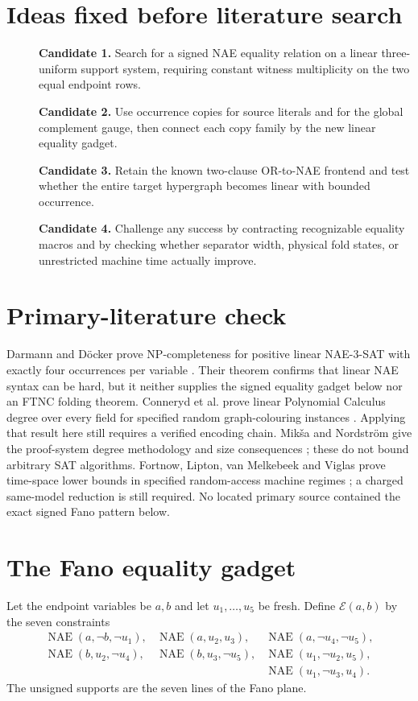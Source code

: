 \documentclass[11pt]{article}
\begin{document}
\section{Ideas fixed before literature search}
\begin{description}
\item[] \textbf{Candidate 1.} Search for a signed NAE equality relation on a
linear three-uniform support system, requiring constant witness multiplicity
on the two equal endpoint rows.
\item[] \textbf{Candidate 2.} Use occurrence copies for source literals and
for the global complement gauge, then connect each copy family by the new
linear equality gadget.
\item[] \textbf{Candidate 3.} Retain the known two-clause OR-to-NAE frontend
and test whether the entire target hypergraph becomes linear with bounded
occurrence.
\item[] \textbf{Candidate 4.} Challenge any success by contracting recognizable
equality macros and by checking whether separator width, physical fold states,
or unrestricted machine time actually improve.
\end{description}

\section{Primary-literature check}
Darmann and D\"ocker prove NP-completeness for positive linear NAE-3-SAT with
exactly four occurrences per variable \cite{DD}.  Their theorem confirms that
linear NAE syntax can be hard, but it neither supplies the signed equality
gadget below nor an FTNC folding theorem.  Conneryd et al. prove linear
Polynomial Calculus degree over every field for specified random
graph-colouring instances \cite{Conneryd}.  Applying that result here still
requires a verified encoding chain.  Mik\v{s}a and Nordstr\"om give the
proof-system degree methodology and size consequences \cite{MN}; these do not
bound arbitrary SAT algorithms.  Fortnow, Lipton, van Melkebeek and Viglas
prove time-space lower bounds in specified random-access machine regimes
\cite{FLMV}; a charged same-model reduction is still required.  No located
primary source contained the exact signed Fano pattern below.

\section{The Fano equality gadget}
Let the endpoint variables be $a,b$ and let $u_1,\ldots,u_5$ be fresh.  Define
$\mathcal E(a,b)$ by the seven constraints
\[
\begin{array}{lll}
\operatorname{NAE}(a,\neg b,\neg u_1),&
\operatorname{NAE}(a,u_2,u_3),&
\operatorname{NAE}(a,\neg u_4,\neg u_5),\\
\operatorname{NAE}(b,u_2,\neg u_4),&
\operatorname{NAE}(b,u_3,\neg u_5),&
\operatorname{NAE}(u_1,\neg u_2,u_5),\\
&&\operatorname{NAE}(u_1,\neg u_3,u_4).
\end{array}
\]
The unsigned supports are the seven lines of the Fano plane.
\end{document}
